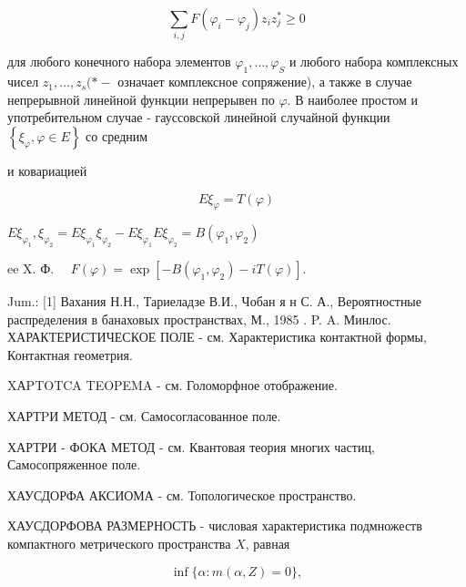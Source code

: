 \documentclass[10pt]{article}
\begin{document}
\[

\sum_{i, j} F\left(\varphi_{i}-\varphi_{j}\right) z_{i} z_{j}^{*} \geqslant 0

\]



для любого конечного набора элементов $\varphi_{1}, \ldots, \varphi_{S}$ и любого набора комплексных чисел $z_{1}, \ldots, z_{s}(*-$ означает комплексное сопряжение), а также в случае непрерывной линейной функции непрерывен по $\varphi$. В наиболее простом и употребительном случае - гауссовской линейной случайной функции $\left\{\xi_{\varphi}, \varphi \in E\right\}$ со средним



и ковариацией



\[

E \xi_{\varphi}=T(\varphi)

\]



$E \xi_{\varphi_{1}}, \xi_{\varphi_{2}}=E \xi_{\varphi_{1}} \xi_{\varphi_{2}}-E \xi_{\varphi_{1}} E \xi_{\varphi_{2}}=B\left(\varphi_{1}, \varphi_{2}\right)$



ee X. Ф. $\quad F(\varphi)=\exp \left[-B\left(\varphi_{1}, \varphi_{2}\right)-i T(\varphi)\right]$.



Jum.: [1] Вахания Н.Н., Тариеладзе В.И., Чобан я н С. А., Вероятностные распределения в банаховых пространствах, М., 1985 . P. A. Минлос. ХАРАКТЕРИСТИЧЕСКОЕ ПОЛЕ - см. Характеристика контактной формы, Контактная геометрия.



XАPTOTCA TEOPEMA - см. Голоморфное отображение.



ХАРТPИ МЕТОД - см. Самосогласованное поле.



ХАРТРИ - ФОКА МЕТОД - см. Квантовая теория многих частиц, Самосопряженное поле.



ХАУСДОРФА АКСИОМА - см. Топологическое пространство.



ХАУСДОРФОВА РАЗМЕРНОСТЬ - числовая характеристика подмножеств компактного метрического пространства $X$, равная



\[

\inf \{\alpha: m(\alpha, Z)=0\},

\]
\end{document}
